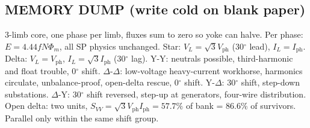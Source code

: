 \documentclass[11pt]{article}
\begin{document}
\subsection*{\color{copper}MEMORY DUMP (write cold on blank paper)}
3-limb core, one phase per limb, fluxes sum to zero so yoke can halve. Per phase: $E = 4.44 f N \Phi_m$, all SP physics unchanged. Star: $V_L = \sqrt{3} V_{\text{ph}}$ (30$^\circ$ lead), $I_L = I_{\text{ph}}$. Delta: $V_L = V_{\text{ph}}$, $I_L = \sqrt{3} I_{\text{ph}}$ (30$^\circ$ lag). Y-Y: neutrals possible, third-harmonic and float trouble, 0$^\circ$ shift. $\Delta$-$\Delta$: low-voltage heavy-current workhorse, harmonics circulate, unbalance-proof, open-delta rescue, 0$^\circ$ shift. Y-$\Delta$: 30$^\circ$ shift, step-down substations. $\Delta$-Y: 30$^\circ$ shift reversed, step-up at generators, four-wire distribution. Open delta: two units, $S_{VV} = \sqrt{3} V_{\text{ph}} I_{\text{ph}} = 57.7\%$ of bank = 86.6\% of survivors. Parallel only within the same shift group.
\end{document}
